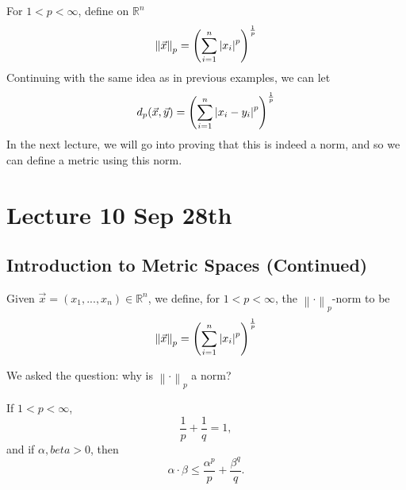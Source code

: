 \documentclass[notoc,notitlepage]{tufte-book}
\newcommand{\norm}[1]{\left\| #1 \right\|}
\begin{document}
\begin{eg}
  For $1 < p < \infty$, define on $\mathbb{R}^n$
  \begin{equation*}
    \norm{\vec{x}}_p = \left( \sum_{i=1}^{n} \abs{x_i}^p \right)^\frac{1}{p}
  \end{equation*}
  Continuing with the same idea as in previous examples, we can let
  \begin{equation*}
    d_p(\vec{x}, \vec{y}) = \left( \sum_{i=1}^{n} \left|x_i - y_i\right|^p \right)^\frac{1}{p}
  \end{equation*}
  In the next lecture, we will go into proving that this is indeed a norm, and so we can define a metric using this norm.
\end{eg}



\chapter{Lecture 10 Sep 28th}%
\label{chp:lecture_10_sep_28th}

\section{Introduction to Metric Spaces (Continued)}%
\label{sec:introduction_to_metric_spaces_continued}

\begin{defn}[$\norm\cdot_p$-norm]\index{$\norm\cdot_p$-norm}
\label{defn:p_norm}
  Given $\vec{x} = ( x_1, ..., x_n ) \in \mathbb{R}^n$, we define, for $1 < p < \infty$, the $\norm\cdot_p$-norm to be
  \begin{equation*}
    \norm{\vec{x}}_p = \left( \sum_{i=1}^{n} \abs{x_i}^p \right)^{\frac{1}{p}}
  \end{equation*}
\end{defn}

We asked the question: why is $\norm\cdot_p$ a norm?

\begin{lemma}
\label{lemma:lemma_for_holders}
  If $1 < p < \infty$,
  \begin{equation*}
    \frac{1}{p} + \frac{1}{q} = 1,
  \end{equation*}
  and if $\alpha, beta > 0$, then
  \begin{equation*}
    \alpha \cdot \beta \leq \frac{\alpha^p}{p} + \frac{\beta^q}{q}.
  \end{equation*}
\end{lemma}
\end{document}
